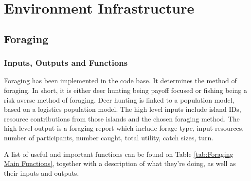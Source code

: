 \chapter{Environment Infrastructure}
\section{Foraging}
\subsection{Inputs, Outputs and Functions}

Foraging has been implemented in the code base. It determines the method of foraging. In short, it is either deer hunting being payoff focused or fishing being a risk averse method of foraging. Deer hunting is linked to a population model, based on a logistics population model. The high level inputs include island IDs, resource contributions from those islands and the chosen foraging method. The high level output is a foraging report which include forage type, input resources, number of participants, number caught, total utility, catch sizes, turn.\newline

A list of useful and important functions can be found on Table \ref{tab:Foraging Main Functions}, together with a description of what they're doing, as well as their inputs and outputs.

